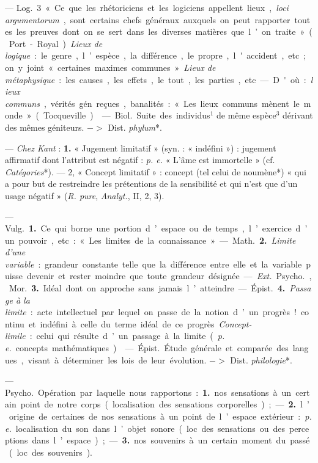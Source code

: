 \begin{itemize}[leftmargin=1cm, label=, itemsep=1pt]
— \si{Log.} 3 « Ce que les rhétoriciens et les logiciens appellent lieux,
{\it loci argumentorum}, sont certains chefs généraux auxquels on peut
rapporter toutes les preuves dont on se sert dans les diverses matières que
l’on traite » (Port-Royal). {\it Lieux de logique} : le genre, l’espèce, la
différence, le propre, l'accident, etc. ; on y joint « certaines maximes
communes ». {\it Lieux de métaphysique} : les causes, les effets, le tout,
les parties, etc. — D'où : {\it lieux communs}, vérités gén. reçues,
banalités : « Les lieux communs mènent le monde » (Tocqueville).

 — \si{Biol.} Suite des individus$^1$ de même espèce$^3$ dérivant
des mêmes géniteurs. $->$ Dist. {\it phylum}*.

 — {\it Chez Kant} : {\bf 1.} « Jugement limitatif » (syn. :
« indéfini ») : jugement affirmatif dont l’attribut est négatif : {\it p. e.}
« L’âme est immortelle » (cf. {\it Catégories}*). — 2, « Concept
limitatif » : concept (tel celui de noumène*) « qui a pour but de restreindre
les prétentions de la sensibilité et qui n’est que d'un usage négatif »
({\it R. pure}, {\it Analyt.}, II, 2, 3).

 — \si{Vulg.} {\bf 1.} Ce qui borne une portion d’espace ou de temps, l’exercice d’un pouvoir, etc. : « Les limites de la connaissance ».

— \si{Math.} {\bf 2.} {\it Limite d'une variable} : grandeur constante telle
que la différence entre elle et la variable puisse devenir et rester moindre
que toute grandeur désignée.

— {\it Ext.} \si{Psycho.}, \si{Mor.} {\bf 3.} Idéal dont on approche sans
jamais l’atteindre. — \si{Épist.} {\bf 4.} {\it Passage à la limite} : acte
intellectuel par lequel on passe de la notion d’un progrès! continu et
indéfini à celle du terme idéal de ce progrès. {\it Concept-limile} : celui
qui résulte d’un passage à la limite ({\it p. e.} concepts mathématiques).

 — \si{Épist.} Étude générale et comparée des langues,
visant à déterminer les lois de leur évolution.  $->$ Dist. {\it philologie}*.

 — \si{Psycho.} Opération par laquelle nous rapportons :
{\bf 1.} nos sensations à un certain point de notre corps (localisation des
sensations corporelles) ; — {\bf 2.} l’origine de certaines de nos sensations
à un point de l’espace extérieur : {\it p. e.} localisation du son dans
l’objet sonore (loc. des sensations ou des perceptions dans l’espace) ; —
{\bf 3.} nos souvenirs à un certain moment du passé (loc. des souvenirs).


\end{itemize}

